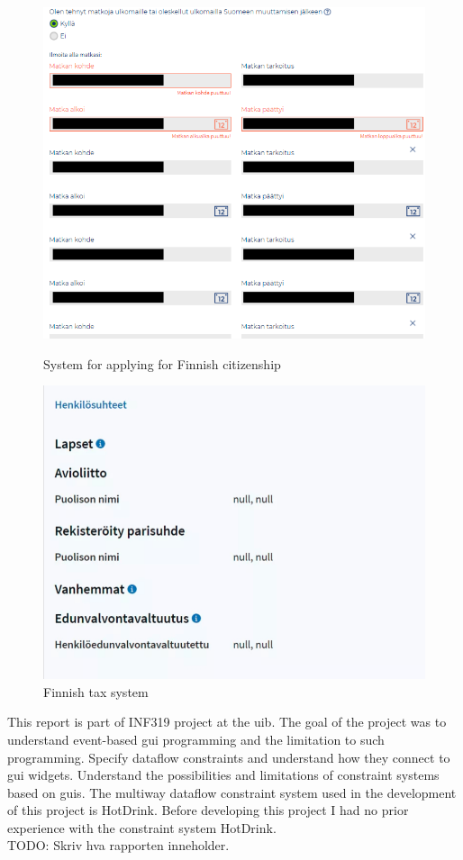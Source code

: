 \begin{figure}
    \caption{System for applying for Finnish citizenship}
    \centering
    \includegraphics[scale=0.55]{figures/enterfinland-ui-citizenship-cant-remove-first-trip.png}
    \label{fig:enterfinland}
\end{figure}


\begin{figure}
    \centering
    \includegraphics[scale=0.45]{figures/finnishSkatteetaten.png}
    \caption{Finnish tax system}
\end{figure}


This report is part of INF319 project at the \gls{uib}. The goal of the project was to understand event-based \gls{gui} programming and the limitation to such programming. Specify dataflow constraints and understand how they connect to \gls{gui} widgets. Understand the possibilities and limitations of constraint systems based on \gls{gui}s. The multiway dataflow constraint system used in the development of this project is HotDrink. Before developing this project I had no prior experience with the constraint system HotDrink. 
\\TODO: Skriv hva rapporten inneholder.
